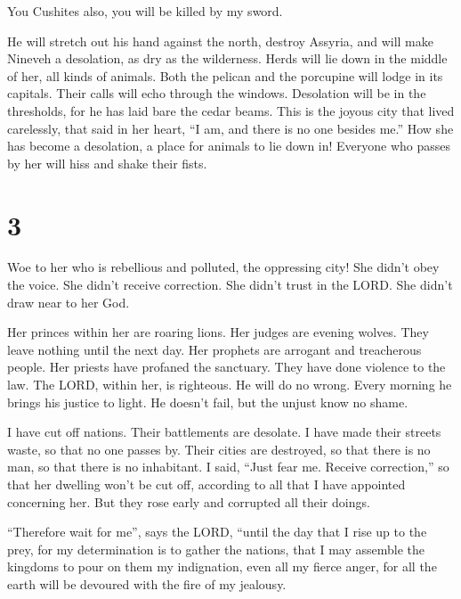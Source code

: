  You Cushites also, you will be killed by my sword.

 He will stretch out his hand against the north, destroy
Assyria, and will make Nineveh a desolation, as dry as the wilderness.
 Herds will lie down in the middle of her, all kinds of
animals. Both the pelican and the porcupine will lodge in its capitals.
Their calls will echo through the windows. Desolation will be in the
thresholds, for he has laid bare the cedar beams.  This
is the joyous city that lived carelessly, that said in her heart, ``I
am, and there is no one besides me.'' How she has become a desolation, a
place for animals to lie down in! Everyone who passes by her will hiss
and shake their fists.

\hypertarget{section-2}{%
\section{3}\label{section-2}}

 Woe to her who is rebellious and polluted, the oppressing
city!  She didn't obey the voice. She didn't receive
correction. She didn't trust in the LORD. She didn't draw near to her
God.

 Her princes within her are roaring lions. Her judges are
evening wolves. They leave nothing until the next day. 
Her prophets are arrogant and treacherous people. Her priests have
profaned the sanctuary. They have done violence to the law.
 The LORD, within her, is righteous. He will do no wrong.
Every morning he brings his justice to light. He doesn't fail, but the
unjust know no shame.

 I have cut off nations. Their battlements are desolate. I
have made their streets waste, so that no one passes by. Their cities
are destroyed, so that there is no man, so that there is no inhabitant.
 I said, ``Just fear me. Receive correction,'' so that her
dwelling won't be cut off, according to all that I have appointed
concerning her. But they rose early and corrupted all their doings.

 ``Therefore wait for me'', says the LORD, ``until the day
that I rise up to the prey, for my determination is to gather the
nations, that I may assemble the kingdoms to pour on them my
indignation, even all my fierce anger, for all the earth will be
devoured with the fire of my jealousy.

